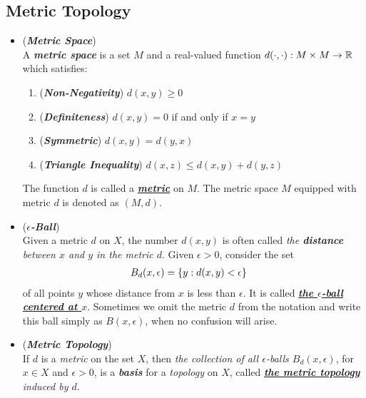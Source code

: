 \documentclass[11pt]{article}
\begin{document}
\subsection{Metric Topology}
\begin{itemize}
\item \begin{definition} (\emph{\textbf{Metric Space}})\\
A \emph{\textbf{metric space}} is a set $M$ and a real-valued function $d(\cdot , \cdot): M \times M \rightarrow {\mathbb R}$  which satisfies:
\begin{enumerate}
\item (\emph{\textbf{Non-Negativity}}) $d(x, y) \ge 0$
\item (\emph{\textbf{Definiteness}}) $d(x, y) = 0$ if and only if $x = y$
\item (\emph{\textbf{Symmetric}}) $d(x, y) = d(y, x)$
\item (\emph{\textbf{Triangle Inequality}}) $d(x, z) \le d(x, y) + d(y, z)$
\end{enumerate} The function $d$ is called a \underline{\emph{\textbf{metric}}} on $M$. The metric space $M$ equipped with metric $d$ is denoted as $(M, d)$.
\end{definition}

\item \begin{definition} (\emph{\textbf{$\epsilon$-Ball}})\\
Given a metric $d$ on $X$, the number $d(x, y)$ is often called \emph{the \textbf{distance} between $x$ and $y$ in the metric $d$}. Given $\epsilon > 0$, consider the set
\begin{align*}
B_{d}(x, \epsilon) &= \left\{y: d(x,y) < \epsilon\right\}
\end{align*}
of all points $y$ whose distance from $x$ is less than $\epsilon$. It is called \underline{\emph{\textbf{the $\epsilon$-ball centered at $x$}}}. Sometimes we omit the metric $d$ from the notation and write this ball simply as $B(x, \epsilon)$, when no confusion will arise.
\end{definition}

\item \begin{definition} (\emph{\textbf{Metric Topology}})\\
If $d$ is a \emph{metric} on the set $X$, then \emph{the collection of all $\epsilon$-balls $B_{d}(x, \epsilon)$}, for $x \in X$ and $\epsilon > 0$, is a \emph{\textbf{basis}} for a \emph{topology} on $X$, called \emph{\underline{\textbf{the metric topology}} induced by $d$}.
\end{definition}


\end{itemize}
\end{document}
